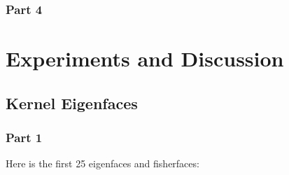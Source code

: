 \documentclass{homework}
\begin{document}
\subsubsection{Part 4}

\section{Experiments and Discussion}

\subsection{Kernel Eigenfaces}

\subsubsection{Part 1}

Here is the first 25 eigenfaces and fisherfaces:
\end{document}
